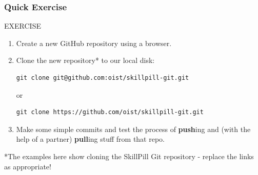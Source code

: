 \documentclass{beamer}
\begin{document}
\begin{frame}[fragile]
\frametitle{Quick Exercise}
    \begin{block}{EXERCISE}
        \begin{enumerate}
        \item Create a new GitHub repository using a browser.
        \item Clone the new repository* to our local disk:
        \begin{lstlisting}
git clone git@github.com:oist/skillpill-git.git
        \end{lstlisting}
        or
        \begin{lstlisting}
git clone https://github.com/oist/skillpill-git.git
        \end{lstlisting}
        \item Make some simple commits and test the process of \textbf{push}ing and (with the help of a partner) \textbf{pull}ing stuff from that repo.
        \end{enumerate}
    \end{block}

*The examples here show cloning the SkillPill Git repository - replace the links as appropriate!
\end{frame}
\end{document}
